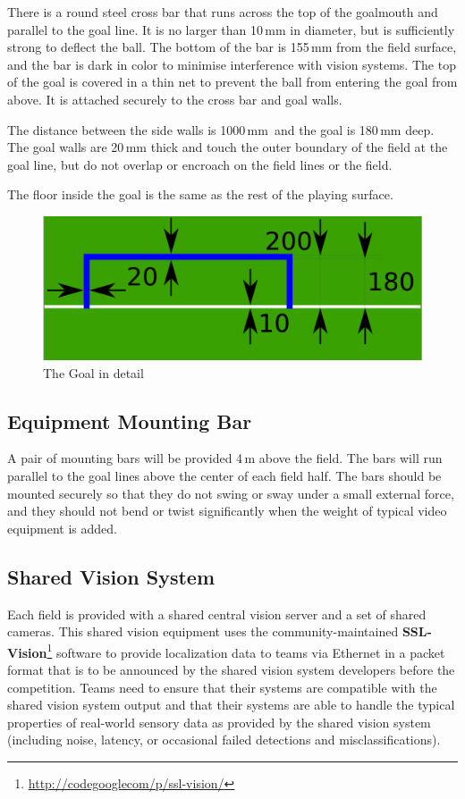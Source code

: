 There is a round steel cross bar that runs across the top of the goalmouth and
parallel to the goal line. It is no larger than 10\,mm in diameter, but is
sufficiently strong to deflect the ball. The bottom of the bar is 155\,mm from
the field surface, and the bar is dark in color to minimise interference with
vision systems. The top of the goal is covered in a thin net to prevent the ball
from entering the goal from above. It is attached securely to the cross bar and
goal walls.

The distance between the side walls is 1000\,mm\, and the goal is 180\,mm deep.
The goal walls are 20\,mm thick and touch the outer boundary of the field at
the goal line, but do not overlap or encroach on the field lines or the field.

The floor inside the goal is the same as the rest of the playing surface.

\begin{figure}[ht] %
  \centering
  \includegraphics[width=0.5\columnwidth]{img/goal_detail.png}
  \caption{The Goal in detail}
  \label{fig:sslgoal}
\end{figure}

\subsection{Equipment Mounting Bar}

A pair of mounting bars will be provided 4\,m
above the field. The bars will run parallel to the goal lines above the
center of each field half. The bars should be mounted
securely so that they do not swing or sway under a
small external force, and they should not bend or twist
significantly when the weight of typical video equipment is added.

\subsection{Shared Vision System}
Each field is provided with a shared central vision server and a set of shared
cameras. This shared vision equipment uses the community-maintained
\textbf{SSL-Vision}\footnote{\url{http://codegooglecom/p/ssl-vision/}} software
to provide localization data to teams via Ethernet in a packet format that is to
be announced by the shared vision system developers before the competition.
Teams need to ensure that their systems are compatible with the shared vision
system output and that their systems are able to handle the typical properties
of real-world sensory data as provided by the shared vision system (including
noise, latency, or occasional failed detections and misclassifications).

